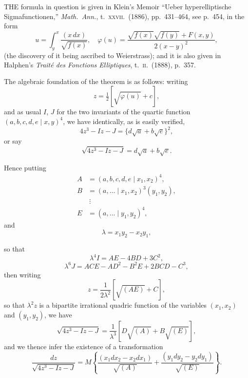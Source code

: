 \documentclass[11pt,a4paper]{article}
\begin{document}
THE formula in question is given in Klein's Memoir ``Ueber hyperelliptische Sigmafunctionen,'' \emph{Math.\ Ann.}, t.\ \textsc{xxvii}.\ (1886), pp.\ 431--464, see p.\ 454, in the form
\[
u = \int_y^x \frac{(x\,dx)}{\sqrt{f(x)}},\quad \varphi(u) = \frac{\sqrt{f(x)}\sqrt{f(y)} + F(x, y)}{2(x - y)^2},
\]
(the discovery of it being ascribed to Weierstrass); and it is also given in Halphen's \emph{Trait\'e des Fonctions Elliptiques}, t.\ \textsc{ii}.\ (1888), p.\ 357.

\smallskip
The algebraic foundation of the theorem is as follows: writing
\[
z = \tfrac{1}{2}\!\left[\sqrt{\varphi(u)} + c\right],
\]
and as usual $I$, $J$ for the two invariants of the quartic function $(a, b, c, d, e \mid x, y)^4$, we have identically, as is easily verified,
\[
4z^3 - Iz - J = \{d\sqrt{a} + b\sqrt{e}\}^2,
\]
or say
\[
\sqrt{4z^3 - Iz - J} = d\sqrt{a} + b\sqrt{e}.
\]

Hence putting
\begin{align*}
A &= (a, b, c, d, e \mid x_1, x_2)^4,\\
B &= (a, \ldots \mid x_1, x_2)^3(y_1, y_2),\\
&\ \vdots\\
E &= (a, \ldots \mid y_1, y_2)^4,
\end{align*}
and
\[
\lambda = x_1 y_2 - x_2 y_1,
\]

\newpage

so that
\[
\lambda^4 I = AE - 4BD + 3C^2,
\]
\[
\lambda^6 J = ACE - AD^2 - B^2 E + 2BCD - C^3,
\]
then writing
\[
z = \frac{1}{2\lambda^2}\!\left[\sqrt{(AE)} + C\right],
\]
so that $\lambda^2 z$ is a bipartite irrational quadric function of the variables $(x_1, x_2)$ and $(y_1, y_2)$, we have
\[
\sqrt{4z^3 - Iz - J} = \frac{1}{\lambda^3}\!\left[D\sqrt{(A)} + B\sqrt{(E)}\right],
\]
and we thence infer the existence of a transformation
\[
\frac{dz}{\sqrt{4z^3 - Iz - J}} = M\!\left\{\frac{(x_1 dx_2 - x_2 dx_1)}{\sqrt{(A)}} + \frac{(y_1 dy_2 - y_2 dy_1)}{\sqrt{(E)}}\right\}.
\]
\end{document}

